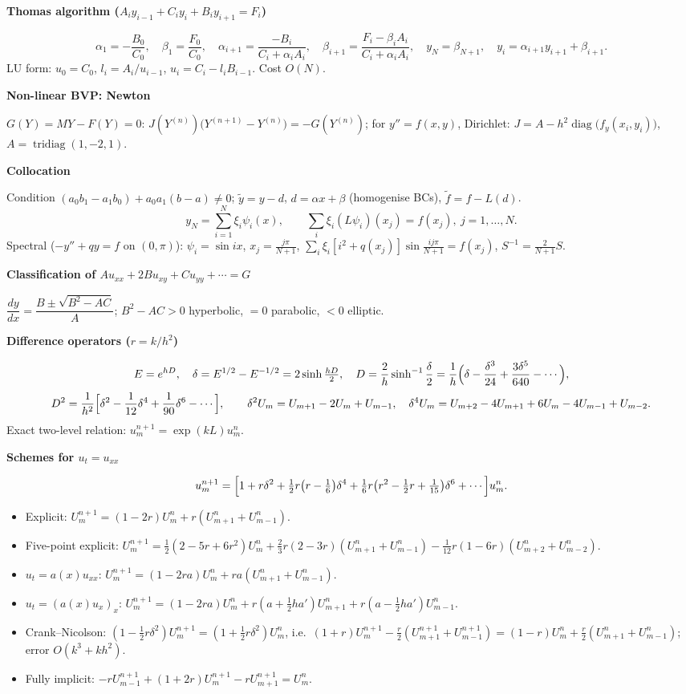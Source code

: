 \documentclass[10pt,a4paper]{article}
\newcommand{\head}[1]{\par\smallskip\noindent\textbf{\color{blue!50!black}#1}\par\nobreak}
\begin{document}
\head{Thomas algorithm (\(A_iy_{i-1}+C_iy_i+B_iy_{i+1}=F_i\))}
\[
  \alpha_1=-\frac{B_0}{C_0},\quad\beta_1=\frac{F_0}{C_0},\quad
  \alpha_{i+1}=\frac{-B_i}{C_i+\alpha_iA_i},\quad
  \beta_{i+1}=\frac{F_i-\beta_iA_i}{C_i+\alpha_iA_i},\quad
  y_N=\beta_{N+1},\quad y_i=\alpha_{i+1}y_{i+1}+\beta_{i+1}.
\]
LU form: \(u_0=C_0\), \(l_i=A_i/u_{i-1}\), \(u_i=C_i-l_iB_{i-1}\). Cost \(O(N)\).

\head{Non-linear BVP: Newton}
\(G(Y)=MY-F(Y)=0\):\;
\(J(Y^{(n)})\bigl(Y^{(n+1)}-Y^{(n)}\bigr)=-G(Y^{(n)})\);\;
for \(y''=f(x,y)\), Dirichlet: \(J=A-h^2\operatorname{diag}\bigl(f_y(x_i,y_i)\bigr)\), \(A=\operatorname{tridiag}(1,-2,1)\).

\head{Collocation}
Condition \((a_0b_1-a_1b_0)+a_0a_1(b-a)\ne0\);\;
\(\tilde y=y-d\), \(d=\alpha x+\beta\) (homogenise BCs), \(\tilde f=f-L(d)\).
\[
  y_N=\sum_{i=1}^N\xi_i\psi_i(x),\qquad
  \sum_i\xi_i(L\psi_i)(x_j)=f(x_j),\ j=1,\dots,N.
\]
Spectral (\(-y''+qy=f\) on \((0,\pi)\)): \(\psi_i=\sin ix\), \(x_j=\frac{j\pi}{N+1}\),
\(\sum_i\xi_i[i^2+q(x_j)]\sin\frac{ij\pi}{N+1}=f(x_j)\), \(S^{-1}=\frac2{N+1}S\).

\head{Classification of \(Au_{xx}+2Bu_{xy}+Cu_{yy}+\cdots=G\)}
\(\dfrac{dy}{dx}=\dfrac{B\pm\sqrt{B^2-AC}}A\);\;
\(B^2-AC>0\) hyperbolic,\; \(=0\) parabolic,\; \(<0\) elliptic.

\head{Difference operators (\(r=k/h^2\))}
\[
  E=e^{hD},\quad \delta=E^{1/2}-E^{-1/2}=2\sinh\tfrac{hD}2,\quad
  D=\frac2h\sinh^{-1}\frac\delta2=\frac1h\Bigl(\delta-\frac{\delta^3}{24}+\frac{3\delta^5}{640}-\cdots\Bigr),
\]
\[
  D^2=\frac1{h^2}\Bigl[\delta^2-\frac1{12}\delta^4+\frac1{90}\delta^6-\cdots\Bigr],\qquad
  \delta^2U_m=U_{m+1}-2U_m+U_{m-1},\quad
  \delta^4U_m=U_{m+2}-4U_{m+1}+6U_m-4U_{m-1}+U_{m-2}.
\]
Exact two-level relation: \(u_m^{n+1}=\exp(kL)u_m^n\).

\head{Schemes for \(u_t=u_{xx}\)}
\[
  u_m^{n+1}=\Bigl[1+r\delta^2+\tfrac12r\bigl(r-\tfrac16\bigr)\delta^4
  +\tfrac16r\bigl(r^2-\tfrac12r+\tfrac1{15}\bigr)\delta^6+\cdots\Bigr]u_m^n .
\]
\begin{itemize}
  \item Explicit: \(U_m^{n+1}=(1-2r)U_m^n+r(U_{m+1}^n+U_{m-1}^n)\).
  \item Five-point explicit:
    \(U_m^{n+1}=\frac12(2-5r+6r^2)U_m^n+\frac23r(2-3r)(U_{m+1}^n+U_{m-1}^n)-\frac1{12}r(1-6r)(U_{m+2}^n+U_{m-2}^n)\).
  \item \(u_t=a(x)u_{xx}\): \(U_m^{n+1}=(1-2ra)U_m^n+ra(U_{m+1}^n+U_{m-1}^n)\).
  \item \(u_t=(a(x)u_x)_x\):
    \(U_m^{n+1}=(1-2ra)U_m^n+r(a+\frac12ha')U_{m+1}^n+r(a-\frac12ha')U_{m-1}^n\).
  \item Crank--Nicolson: \((1-\frac12r\delta^2)U_m^{n+1}=(1+\frac12r\delta^2)U_m^n\), i.e.\
    \((1+r)U_m^{n+1}-\frac r2(U_{m+1}^{n+1}+U_{m-1}^{n+1})=(1-r)U_m^n+\frac r2(U_{m+1}^n+U_{m-1}^n)\); error \(O(k^3+kh^2)\).
  \item Fully implicit: \(-rU_{m-1}^{n+1}+(1+2r)U_m^{n+1}-rU_{m+1}^{n+1}=U_m^n\).
\end{itemize}
\end{document}
